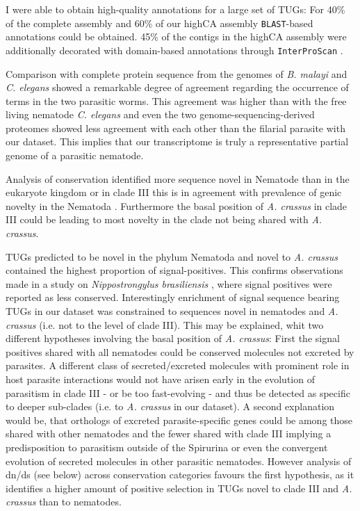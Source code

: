 I were able to obtain high-quality annotations for a large set of
TUGs: For 40\% of the complete assembly and 60\% of our highCA
assembly \texttt{BLAST}-based annotations could be obtained. 45\% of
the contigs in the highCA assembly were additionally decorated with
domain-based annotations through \texttt{InterProScan}
\cite{pmid11590104}.

Comparison with complete protein sequence from the genomes of
\textit{B. malayi} and \textit{C. elegans} showed a remarkable degree
of agreement regarding the occurrence of terms in the two parasitic
worms. This agreement was higher than with the free living nematode
\textit{C. elegans} and even the two genome-sequencing-derived
proteomes showed less agreement with each other than the filarial
parasite with our dataset. This implies that our transcriptome is
truly a representative partial genome
\cite{parkinson_partigene--constructing_2004} of a parasitic nematode.

Analysis of conservation identified more sequence novel in Nematode
than in the eukaryote kingdom or in clade III this is in agreement
with prevalence of genic novelty in the Nematoda
\cite{wasmuth_extent_2008}. Furthermore the basal position of
\textit{A. crassus} in clade III could be leading to most novelty in
the clade not being shared with \textit{A. crassus}.

TUGs predicted to be novel in the phylum Nematoda and novel to
\textit{A. crassus} contained the highest proportion of
signal-positives. This confirms observations made in a study on
\textit{Nippostrongylus brasiliensis} \cite{harcus_signal_2004}, where
signal positives were reported as less conserved. Interestingly
enrichment of signal sequence bearing TUGs in our dataset was
constrained to sequences novel in nematodes and \textit{A. crassus}
(i.e. not to the level of clade III). This may be explained, whit two
different hypotheses involving the basal position of
\textit{A. crassus}: First the signal positives shared with all
nematodes could be conserved molecules not excreted by parasites. A
different class of secreted/excreted molecules with prominent role in
host parasite interactions would not have arisen early in the
evolution of parasitism in clade III - or be too fast-evolving - and
thus be detected as specific to deeper sub-clades (i.e. to
\textit{A. crassus} in our dataset). A second explanation would be,
that orthologs of excreted parasite-specific genes could be among
those shared with other nematodes and the fewer shared with clade III
implying a predisposition to parasitism outside of the Spirurina or
even the convergent evolution of secreted molecules in other parasitic
nematodes. However analysis of dn/ds (see below) across conservation
categories favours the first hypothesis, as it identifies a higher
amount of positive selection in TUGs novel to clade III and
\textit{A. crassus} than to nematodes.

